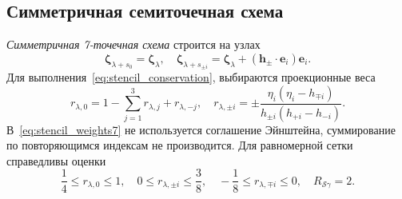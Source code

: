 \documentclass[a4paper,12pt]{article}
\newcommand{\bzeta}{\boldsymbol{\zeta}}
\newcommand{\bh}{\boldsymbol{h}}
\newcommand{\be}{\boldsymbol{e}}
\begin{document}
\subsection{Симметричная семиточечная схема}

\emph{Симметричная 7-точечная схема} строится на узлах
\begin{equation}\label{eq:stencil_nodes7}
    \bzeta_{\lambda+s_0} = \bzeta_{\lambda}, \quad
    \bzeta_{\lambda+s_{\pm i}} = \bzeta_{\lambda} + (\bh_\pm\cdot \be_i)\be_i.
\end{equation}
Для выполнения~\eqref{eq:stencil_conservation}, выбираются проекционные веса
\begin{equation}\label{eq:stencil_weights7}
    r_{\lambda,0} = 1 - \sum_{j=1}^3 r_{\lambda,j} + r_{\lambda,-j}, \quad
    r_{\lambda,\pm i} = \pm\frac{\eta_i(\eta_i - h_{\mp i})}{h_{\pm i}(h_{+i}-h_{-i})}.
\end{equation}
В~\eqref{eq:stencil_weights7} не используется соглашение Эйнштейна, суммирование по повторяющимся индексам не производится.
Для равномерной сетки справедливы оценки
\begin{equation}\label{eq:weights_ranges7}
    \frac14 \leq r_{\lambda,0} \leq 1, \quad
    0 \leq r_{\lambda,\pm i} \leq \frac38, \quad
    -\frac18 \leq r_{\lambda,\mp i} \leq 0, \quad
    R_{\mathcal{S}\gamma} = 2.
\end{equation}
\end{document}
